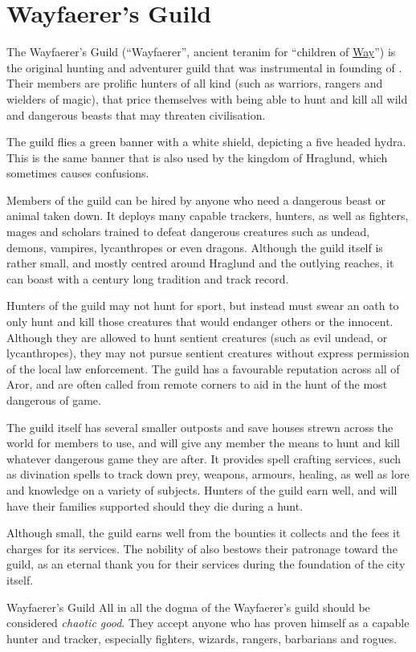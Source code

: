 \section{Wayfaerer's Guild}
\label{sec:Wayfaerers Guild}

The Wayfaerer's Guild (``Wayfaerer'', ancient teranim for ``children of
\hyperref[sec:Eigyr]{Way}'') is the original hunting and adventurer guild that
was instrumental in founding of . Their members are
prolific hunters of all kind (such as warriors, rangers and wielders of
magic), that price themselves with being able to hunt and kill all wild and
dangerous beasts that may threaten civilisation.

The guild flies a green banner with a white shield, depicting a five headed
hydra. This is the same banner that is also used by the kingdom of Hraglund,
which sometimes causes confusions.

Members of the guild can be hired by anyone who need a dangerous beast or animal
taken down. It deploys many capable trackers, hunters, as well as fighters,
mages and scholars trained to defeat dangerous creatures such as undead, demons,
vampires, lycanthropes or even dragons. Although the guild itself is rather
small, and mostly centred around Hraglund and the outlying reaches, it can boast
with a century long tradition and track record.

Hunters of the guild may not hunt for sport, but instead must swear an oath to
only hunt and kill those creatures that would endanger others or the innocent.
Although they are allowed to hunt sentient creatures (such as evil undead, or
lycanthropes), they may not pursue sentient creatures without express permission
of the local law enforcement. The guild has a favourable reputation across all
of Aror, and are often called from remote corners to aid in the hunt of the
most dangerous of game.

The guild itself has several smaller outposts and save houses strewn across the
world for members to use, and will give any member the means to hunt and kill
whatever dangerous game they are after. It provides spell crafting services,
such as divination spells to track down prey, weapons, armours, healing, as well
as lore and knowledge on a variety of subjects. Hunters of the guild earn well,
and will have their families supported should they die during a hunt.

Although small, the guild earns well from the bounties it collects and the fees
it charges for its services. The nobility of  also bestows
their patronage toward the guild, as an eternal thank you for their services
during the foundation of the city itself.

\begin{35e}{Wayfaerer's Guild}
  All in all the dogma of the Wayfaerer's guild should be considered
  \emph{chaotic good}. They accept anyone who has proven himself as a capable
  hunter and tracker, especially fighters, wizards, rangers, barbarians and
  rogues.
\end{35e}
